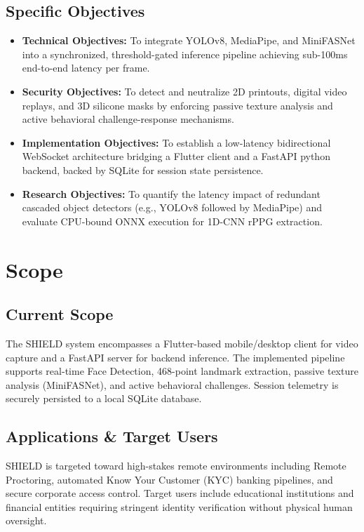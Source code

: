 \documentclass[12pt, a4paper]{report}
\begin{document}
\section{Specific Objectives}
\begin{itemize}
    \item \textbf{Technical Objectives:} To integrate YOLOv8, MediaPipe, and MiniFASNet into a synchronized, threshold-gated inference pipeline achieving sub-100ms end-to-end latency per frame.
    \item \textbf{Security Objectives:} To detect and neutralize 2D printouts, digital video replays, and 3D silicone masks by enforcing passive texture analysis and active behavioral challenge-response mechanisms.
    \item \textbf{Implementation Objectives:} To establish a low-latency bidirectional WebSocket architecture bridging a Flutter client and a FastAPI python backend, backed by SQLite for session state persistence.
    \item \textbf{Research Objectives:} To quantify the latency impact of redundant cascaded object detectors (e.g., YOLOv8 followed by MediaPipe) and evaluate CPU-bound ONNX execution for 1D-CNN rPPG extraction.
\end{itemize}

\chapter{Scope}

\section{Current Scope}
The SHIELD system encompasses a Flutter-based mobile/desktop client for video capture and a FastAPI server for backend inference. The implemented pipeline supports real-time Face Detection, 468-point landmark extraction, passive texture analysis (MiniFASNet), and active behavioral challenges. Session telemetry is securely persisted to a local SQLite database.

\section{Applications \& Target Users}
SHIELD is targeted toward high-stakes remote environments including Remote Proctoring, automated Know Your Customer (KYC) banking pipelines, and secure corporate access control. Target users include educational institutions and financial entities requiring stringent identity verification without physical human oversight.
\end{document}
